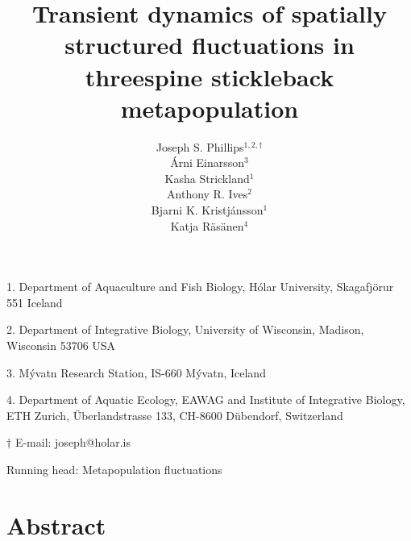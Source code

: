 \documentclass[11pt]{article}
\title{Transient dynamics of spatially structured fluctuations 
        in threespine stickleback metapopulation}
\author{
Joseph S. Phillips$^{1,2, \dagger}$ \\
\'{A}rni Einarsson$^{3}$ \\ 
Kasha Strickland$^{1}$ \\
Anthony R. Ives$^{2}$ \\
Bjarni K. Kristj\'{a}nsson$^{1}$ \\
Katja R\"{a}s\"{a}nen$^{4}$ 
}
\date{}
\begin{document}
\raggedright
\setlength\parindent{0.25in}

\maketitle


\noindent{} 1. Department of Aquaculture and Fish Biology, 
H\'{o}lar University, Skagafj\"{o}r{\dh}ur 551 Iceland

\noindent{} 2. Department of Integrative Biology, 
University of Wisconsin, Madison, Wisconsin 53706 USA

\noindent{} 3. M\'{y}vatn Research Station, IS-660 M\'{y}vatn, Iceland

\noindent{} 4. Department of Aquatic Ecology, EAWAG and 
Institute of Integrative Biology, ETH Zurich, 
\"{U}berlandstrasse 133, CH-8600 D\"{u}bendorf, Switzerland

\noindent{} $\dagger$ E-mail: joseph@holar.is



\bigskip

Running head: {Metapopulation fluctuations}

\linenumbers{}

\clearpage






\section*{Abstract} \label{abstract}
\end{document}
